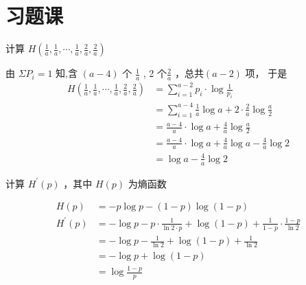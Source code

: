 \section{习题课}
\begin{exercise}
     计算 $ H\left(\frac{1}{a}, \frac{1}{a}, \cdots, \frac{1}{a}, \frac{2}{a}, \frac{2}{a}\right) $
\end{exercise}
\begin{solution}
由 $ \Sigma P_{i}=1 $ 知,含 $ (a-4) $ 个 $ \frac{1}{a}$ , 2 个$ \frac{2}{a} $ ，总共$ (a-2) $ 项， 于是
$$
\begin{aligned}
H\left(\frac{1}{a}, \frac{1}{a}, \cdots, \frac{1}{a}, \frac{2}{a}, \frac{2}{a}\right) & =\sum_{i=1}^{a-2} p_{i} \cdot \log \frac{1}{p_{i}} \\
& =\sum_{i=1}^{a-4} \frac{1}{a} \log a+2 \cdot \frac{2}{a} \log \frac{a}{2} \\
& =\frac{a-4}{a} \cdot \log a+\frac{4}{a} \log \frac{a}{2} \\
& =\frac{a-4}{a} \cdot \log a+\frac{4}{a} \log a-\frac{4}{a} \log 2 \\
& =\log a-\frac{4}{a} \log 2
\end{aligned}
$$
\end{solution}

\begin{exercise}
计算 $ H^{\prime}(p) $ ，其中 $ H(p) $ 为熵函数
\end{exercise}
\begin{solution}
$$
\begin{aligned}
H(p) & =-p \log p-(1-p) \log (1-p) \\
H^{\prime}(p) & =-\log p-p \cdot \frac{1}{\ln 2 \cdot p}+\log (1-p)+\frac{1}{1-p} \cdot \frac{1-p}{\ln 2} \\
& =-\log p-\frac{1}{\ln 2}+\log (1-p)+\frac{1}{\ln 2} \\
& =-\log p+\log (1-p) \\
& =\log \frac{1-p}{p}
\end{aligned}
$$
\end{solution}

